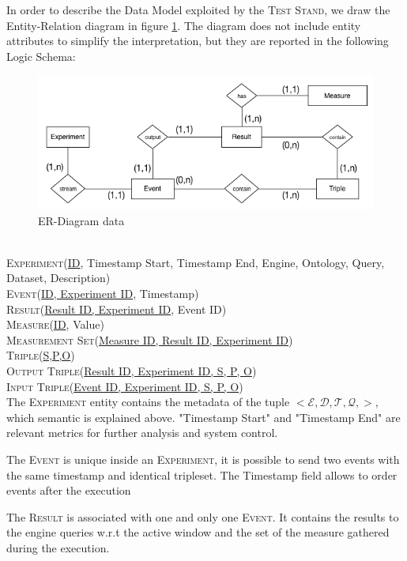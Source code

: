 \noindent In order to describe the Data Model exploited by the \textsc{Test Stand}, we draw the Entity-Relation diagram in figure \ref{fig:er}. The diagram does not include entity attributes to simplify the interpretation, but they are reported in the following Logic Schema:
\begin{figure}[tbh]
  \centering
	\includegraphics[width=\linewidth]{images/er-db}
	\caption{ER-Diagram \name data} 
  	\label{fig:er}
\end{figure}\\
\noindent\textsc{Experiment}(\underline{ID}, Timestamp Start, Timestamp End, Engine, Ontology, Query, Dataset, Description)\\
\textsc{Event}(\underline{ID, Experiment ID}, Timestamp)\\
\textsc{Result}(\underline{Result ID, Experiment ID}, Event ID)\\
\textsc{Measure}(\underline{ID}, Value)\\
\textsc{Measurement Set}(\underline{Measure ID, Result ID, Experiment ID})\\
\textsc{Triple}(\underline{S,P,O})\\
\textsc{Output Triple}(\underline{Result ID, Experiment ID, S, P, O})\\
\textsc{Input Triple}(\underline{Event ID, Experiment ID, S, P, O})\\

The \textsc{Experiment} entity contains the metadata of the tuple $<\mathcal{E},\mathcal{D},\mathcal{T},\mathcal{Q},>$, which semantic is explained above. "Timestamp Start" and "Timestamp End" are relevant metrics for further analysis and system control. 

The \textsc{Event} is unique inside an \textsc{Experiment}, it is possible to send two events with the same timestamp and identical tripleset. The Timestamp field allows to order events after the execution

The \textsc{Result} is associated with one and only one \textsc{Event}. It contains the results to the engine queries w.r.t the active window and the set of the measure gathered during the execution. 

